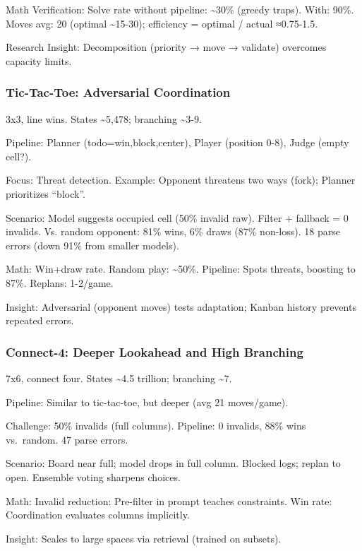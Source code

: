 \documentclass[
]{article}
\begin{document}
Math Verification: Solve rate without pipeline: \textasciitilde30\%
(greedy traps). With: 90\%. Moves avg: 20 (optimal
\textasciitilde15-30); efficiency = optimal / actual ≈0.75-1.5.

Research Insight: Decomposition (priority → move → validate) overcomes
capacity limits.

\subsubsection{Tic-Tac-Toe: Adversarial
Coordination}\label{tic-tac-toe-adversarial-coordination}

3x3, line wins. States \textasciitilde5,478; branching
\textasciitilde3-9.

Pipeline: Planner (todo=win,block,center), Player (position 0-8), Judge
(empty cell?).

Focus: Threat detection. Example: Opponent threatens two ways (fork);
Planner prioritizes ``block''.

Scenario: Model suggests occupied cell (50\% invalid raw). Filter +
fallback = 0 invalids. Vs. random opponent: 81\% wins, 6\% draws (87\%
non-loss). 18 parse errors (down 91\% from smaller models).

Math: Win+draw rate. Random play: \textasciitilde50\%. Pipeline: Spots
threats, boosting to 87\%. Replans: 1-2/game.

Insight: Adversarial (opponent moves) tests adaptation; Kanban history
prevents repeated errors.

\subsubsection{Connect-4: Deeper Lookahead and High
Branching}\label{connect-4-deeper-lookahead-and-high-branching}

7x6, connect four. States \textasciitilde4.5 trillion; branching
\textasciitilde7.

Pipeline: Similar to tic-tac-toe, but deeper (avg 21 moves/game).

Challenge: 50\% invalids (full columns). Pipeline: 0 invalids, 88\% wins
vs.~random. 47 parse errors.

Scenario: Board near full; model drops in full column. Blocked logs;
replan to open. Ensemble voting sharpens choices.

Math: Invalid reduction: Pre-filter in prompt teaches constraints. Win
rate: Coordination evaluates columns implicitly.

Insight: Scales to large spaces via retrieval (trained on subsets).
\end{document}
